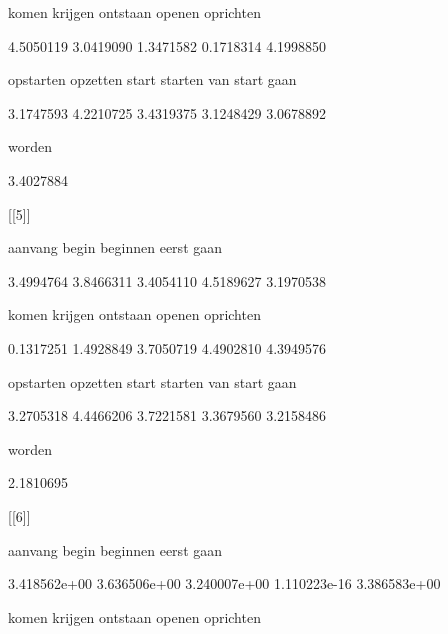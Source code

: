          komen        krijgen       ontstaan         openen      oprichten 



     4.5050119      3.0419090      1.3471582      0.1718314      4.1998850 



     opstarten       opzetten          start        starten van start gaan 



     3.1747593      4.2210725      3.4319375      3.1248429      3.0678892 



        worden 



     3.4027884 



[[5]]



       aanvang          begin       beginnen          eerst           gaan 



     3.4994764      3.8466311      3.4054110      4.5189627      3.1970538 



         komen        krijgen       ontstaan         openen      oprichten 



     0.1317251      1.4928849      3.7050719      4.4902810      4.3949576 



     opstarten       opzetten          start        starten van start gaan 



     3.2705318      4.4466206      3.7221581      3.3679560      3.2158486 



        worden 



     2.1810695 



[[6]]



       aanvang          begin       beginnen          eerst           gaan 



  3.418562e+00   3.636506e+00   3.240007e+00   1.110223e-16   3.386583e+00 



         komen        krijgen       ontstaan         openen      oprichten 



